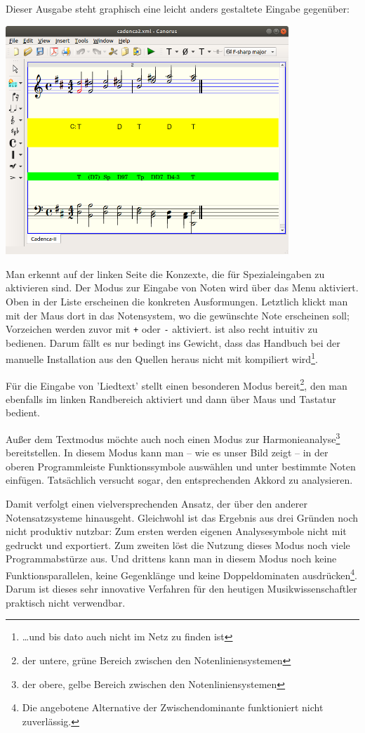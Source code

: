 Dieser Ausgabe steht graphisch eine leicht anders gestaltete Eingabe gegenüber:

\begin{center}
\includegraphics[width=0.8\textwidth]{frontends/cantorus/cadenca2-canorus}
\end{center}

Man erkennt auf der linken Seite die Konzexte, die für Spezialeingaben zu
aktivieren sind. Der Modus zur Eingabe von Noten wird über das Menu aktiviert.
Oben in der Liste erscheinen die konkreten Ausformungen. Letztlich klickt man
mit der Maus dort in das Notensystem, wo die gewünschte Note erscheinen soll;
Vorzeichen werden zuvor mit \texttt{+} oder \texttt{-} aktiviert. 
ist also recht intuitiv zu bedienen. Darum fällt es nur bedingt ins Gewicht, dass
das Handbuch bei der manuelle Installation aus den Quellen heraus nicht mit
kompiliert wird\footnote{\ldots und bis dato auch nicht im Netz zu finden ist}.

Für die Eingabe von 'Liedtext' stellt  einen besonderen Modus
bereit\footnote{der untere, grüne Bereich zwischen den Notenliniensystemen}, den
man ebenfalls im linken Randbereich aktiviert und dann über Maus und Tastatur
bedient.

Außer dem Textmodus möchte  auch noch einen Modus zur
Harmonieanalyse\footnote{der obere, gelbe Bereich zwischen den
Notenliniensystemen} bereitstellen. In diesem Modus kann man -- wie es unser
Bild zeigt -- in der oberen Programmleiste Funktionssymbole auswählen und unter
bestimmte Noten einfügen. Tatsächlich versucht  sogar, den
entsprechenden Akkord zu analysieren.

Damit verfolgt  einen vielversprechenden Ansatz, der über den
anderer Notensatzsysteme hinausgeht. Gleichwohl ist das Ergebnis aus drei
Gründen noch nicht produktiv nutzbar: Zum ersten werden  eigenen
Analysesymbole nicht mit gedruckt und exportiert. Zum zweiten löst die Nutzung
dieses Modus noch viele Programmabstürze aus. Und drittens kann man in diesem
Modus noch keine Funktionsparallelen, keine Gegenklänge und keine
Doppeldominaten ausdrücken\footnote{Die angebotene Alternative der
Zwischendominante funktioniert nicht zuverlässig.}. Darum ist dieses sehr
innovative Verfahren für den heutigen Musikwissenschaftler praktisch nicht
verwendbar.

